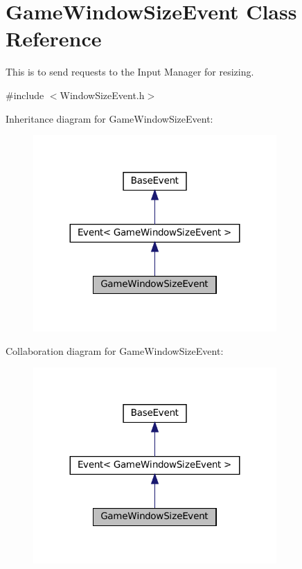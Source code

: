 \hypertarget{classGameWindowSizeEvent}{}\section{Game\+Window\+Size\+Event Class Reference}
\label{classGameWindowSizeEvent}


This is to send requests to the Input Manager for resizing.  




{\ttfamily \#include $<$Window\+Size\+Event.\+h$>$}



Inheritance diagram for Game\+Window\+Size\+Event\+:\nopagebreak
\begin{figure}[H]
\begin{center}
\leavevmode
\includegraphics[width=263pt]{classGameWindowSizeEvent__inherit__graph}
\end{center}
\end{figure}


Collaboration diagram for Game\+Window\+Size\+Event\+:\nopagebreak
\begin{figure}[H]
\begin{center}
\leavevmode
\includegraphics[width=263pt]{classGameWindowSizeEvent__coll__graph}
\end{center}
\end{figure}
